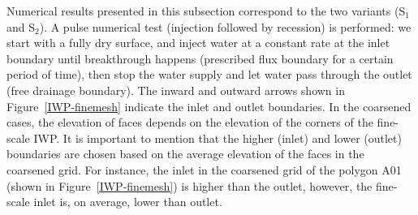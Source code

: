 \documentclass[review,11pt]{elsarticle}
\begin{document}
Numerical results presented in this subsection correspond to the two variants (S$_1$ and S$_2$).
A pulse numerical test (injection followed by recession) is performed: we start with a fully dry surface, and inject water at a constant rate at the inlet boundary until breakthrough happens (prescribed flux boundary for a certain period of time), then stop the water supply and let water pass through the outlet (free drainage boundary).
The inward and outward arrows shown in Figure~\ref{IWP-finemesh} indicate the inlet and outlet boundaries. 
In the coarsened cases, the elevation of faces depends on the elevation of the corners of the fine-scale IWP.
It is important to mention that the higher (inlet) and lower (outlet) boundaries are chosen based on the average elevation of the faces in the coarsened grid.
For instance, the inlet in the coarsened grid of the polygon A01 (shown in Figure~\ref{IWP-finemesh}) is higher than the outlet, however, the fine-scale inlet is, on average, lower than outlet. 
%
\end{document}

